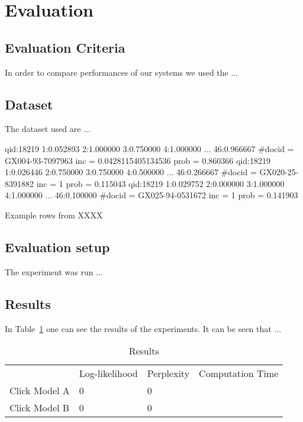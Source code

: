 \section{Evaluation}
\label{sec:evaluation}

\subsection{Evaluation Criteria}
In order to compare performances of our systems we used the ...

\subsection{Dataset}

The dataset used are ...

\begin{loglisting}
\begin{algorithmic}
 qid:18219 1:0.052893 2:1.000000 3:0.750000 4:1.000000 ... 46:0.966667
\State \hspace*{25pt} \#docid = GX004-93-7097963 inc = 0.0428115405134536 prob = 0.860366
 qid:18219 1:0.026446 2:0.750000 3:0.750000 4:0.500000 ... 46:0.266667
\State \hspace*{25pt} \#docid = GX020-25-8391882 inc = 1 prob = 0.115043
 qid:18219 1:0.029752 2:0.000000 3:1.000000 4:1.000000 ... 46:0.100000
\State \hspace*{25pt} \#docid = GX025-94-0531672 inc = 1 prob = 0.141903
\end{algorithmic}
\caption{Example rows from XXXX}
\label{alg:dataset_example}
\end{loglisting}


\subsection{Evaluation setup}
The experiment was run ...

\subsection{Results}
In Table~\ref{table:results} one can see the results of the experiments.
It can be seen that ...

\begin{table}[h]
\centering
\begin{tabular}{l|lll|}
\cline{2-4}
                                          & Log-likelihood  & Perplexity        & Computation Time \\
\cline{1-4}
\multicolumn{1}{|l|}{Click Model A}       & 0               & 0                 &   \\
\multicolumn{1}{|l|}{Click Model B}       & 0               & 0                 &   \\
\cline{1-4}
\end{tabular}
\caption{Results}
\label{table:results}
\end{table}
